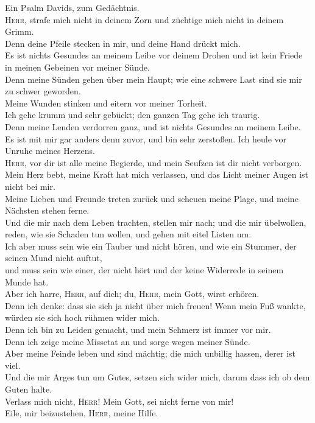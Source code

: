  Ein Psalm Davids, zum Gedächtnis.\\
 \textsc{Herr}, strafe mich nicht in deinem Zorn und
züchtige mich nicht in deinem Grimm.\\
 Denn deine Pfeile stecken in mir, und deine Hand drückt
mich.\\
 Es ist nichts Gesundes an meinem Leibe vor deinem Drohen
und ist kein Friede in meinen Gebeinen vor meiner Sünde.\\
 Denn meine Sünden gehen über mein Haupt; wie eine schwere
Last sind sie mir zu schwer geworden.\\
 Meine Wunden stinken und eitern vor meiner Torheit.\\
 Ich gehe krumm und sehr gebückt; den ganzen Tag gehe ich
traurig.\\
 Denn meine Lenden verdorren ganz, und ist nichts Gesundes
an meinem Leibe.\\
 Es ist mit mir gar anders denn zuvor, und bin sehr
zerstoßen. Ich heule vor Unruhe meines Herzens.\\
 \textsc{Herr}, vor dir ist alle meine Begierde, und mein
Seufzen ist dir nicht verborgen.\\
 Mein Herz bebt, meine Kraft hat mich verlassen, und das
Licht meiner Augen ist nicht bei mir.\\
 Meine Lieben und Freunde treten zurück und scheuen meine
Plage, und meine Nächsten stehen ferne.\\
 Und die mir nach dem Leben trachten, stellen mir nach;
und die mir übelwollen, reden, wie sie Schaden tun wollen, und gehen mit
eitel Listen um.\\
 Ich aber muss sein wie ein Tauber und nicht hören, und
wie ein Stummer, der seinen Mund nicht auftut,\\
 und muss sein wie einer, der nicht hört und der keine
Widerrede in seinem Munde hat.\\
 Aber ich harre, \textsc{Herr}, auf dich; du,
\textsc{Herr}, mein Gott, wirst erhören.\\
 Denn ich denke: dass sie sich ja nicht über mich freuen!
Wenn mein Fuß wankte, würden sie sich hoch rühmen wider mich.\\
 Denn ich bin zu Leiden gemacht, und mein Schmerz ist
immer vor mir.\\
 Denn ich zeige meine Missetat an und sorge wegen meiner
Sünde.\\
 Aber meine Feinde leben und sind mächtig; die mich
unbillig hassen, derer ist viel.\\
 Und die mir Arges tun um Gutes, setzen sich wider mich,
darum dass ich ob dem Guten halte.\\
 Verlass mich nicht, \textsc{Herr}! Mein Gott, sei nicht
ferne von mir!\\
 Eile, mir beizustehen, \textsc{Herr}, meine Hilfe.

